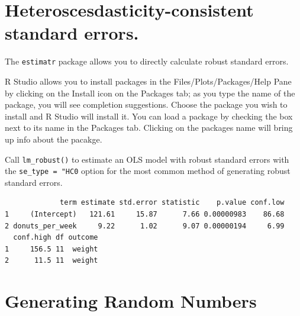 \documentclass[]{book}
\newenvironment{Shaded}{\begin{snugshade}}{\end{snugshade}}
\newcommand{\DataTypeTok}[1]{\textcolor[rgb]{0.13,0.29,0.53}{#1}}
\newcommand{\KeywordTok}[1]{\textcolor[rgb]{0.13,0.29,0.53}{\textbf{#1}}}
\newcommand{\NormalTok}[1]{#1}
\newcommand{\OperatorTok}[1]{\textcolor[rgb]{0.81,0.36,0.00}{\textbf{#1}}}
\newcommand{\StringTok}[1]{\textcolor[rgb]{0.31,0.60,0.02}{#1}}
\begin{document}
\hypertarget{heteroscesdasticity-consistent-standard-errors.}{%
\section{Heteroscesdasticity-consistent standard errors.}\label{heteroscesdasticity-consistent-standard-errors.}}

The \texttt{estimatr} package allows you to directly calculate robust standard errors.

R Studio allows you to install packages in the Files/Plots/Packages/Help Pane by clicking on the Install icon on the Packages tab; as you type the name of the package, you will see completion suggestions. Choose the package you wish to install and R Studio will install it. You can load a package by checking the box next to its name in the Packages tab. Clicking on the packages name will bring up info about the pacakge.

Call \texttt{lm\_robust()} to estimate an OLS model with robust standard errors with the \texttt{se\_type\ =\ "HC0} option for the most common method of generating robust standard errors.

\begin{Shaded}
\end{Shaded}

\begin{verbatim}
             term estimate std.error statistic    p.value conf.low
1     (Intercept)   121.61     15.87      7.66 0.00000983    86.68
2 donuts_per_week     9.22      1.02      9.07 0.00000194     6.99
  conf.high df outcome
1     156.5 11  weight
2      11.5 11  weight
\end{verbatim}

\hypertarget{generating-random-numbers}{%
\section{Generating Random Numbers}\label{generating-random-numbers}}
\end{document}
